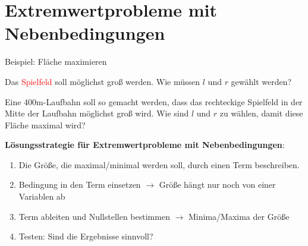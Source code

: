 \clearpage
\section{Extremwertprobleme mit Nebenbedingungen}

\begin{bla}{Beispiel: Fläche maximieren}
  \begin{marginfigure}[5em]
    \caption{Das \textcolor{red}{Spielfeld} soll möglichst groß werden. Wie müssen $l$ und $r$ gewählt werden?}
  \end{marginfigure}
  Eine 400m-Laufbahn soll so gemacht werden, dass das rechteckige Spielfeld in der Mitte der Laufbahn möglichst groß wird. Wie sind $l$ und $r$ zu wählen, damit diese Fläche maximal wird?
\end{bla}

\begin{koch}
  \textbf{Lösungsstrategie für Extremwertprobleme mit Nebenbedingungen}:
  \begin{enumerate}
    \item Die Größe, die maximal/minimal werden soll, durch einen Term beschreiben.
    \item Bedingung in den Term einsetzen $\rightarrow$ Größe hängt nur noch von einer Variablen ab
    \item Term ableiten und Nullstellen bestimmen $\rightarrow$ Minima/Maxima der Größe
    \item Testen: Sind die Ergebnisse sinnvoll?
  \end{enumerate}
\end{koch}



